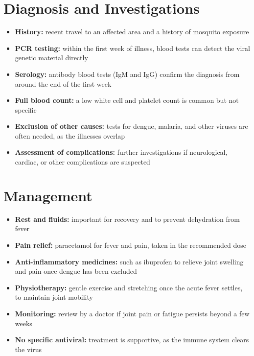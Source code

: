 \section*{Diagnosis and Investigations}
\begin{itemize}
    \item \textbf{History:} recent travel to an affected area and a history of mosquito exposure
    \item \textbf{PCR testing:} within the first week of illness, blood tests can detect the viral genetic material directly
    \item \textbf{Serology:} antibody blood tests (IgM and IgG) confirm the diagnosis from around the end of the first week
    \item \textbf{Full blood count:} a low white cell and platelet count is common but not specific
    \item \textbf{Exclusion of other causes:} tests for dengue, malaria, and other viruses are often needed, as the illnesses overlap
    \item \textbf{Assessment of complications:} further investigations if neurological, cardiac, or other complications are suspected
\end{itemize}

\section*{Management}
\begin{itemize}
    \item \textbf{Rest and fluids:} important for recovery and to prevent dehydration from fever
    \item \textbf{Pain relief:} paracetamol for fever and pain, taken in the recommended dose
    \item \textbf{Anti-inflammatory medicines:} such as ibuprofen to relieve joint swelling and pain once dengue has been excluded
    \item \textbf{Physiotherapy:} gentle exercise and stretching once the acute fever settles, to maintain joint mobility
    \item \textbf{Monitoring:} review by a doctor if joint pain or fatigue persists beyond a few weeks
    \item \textbf{No specific antiviral:} treatment is supportive, as the immune system clears the virus
\end{itemize}

